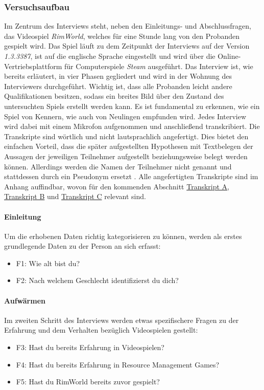 \subsubsection{Versuchsaufbau}
Im Zentrum des Interviews steht, neben den Einleitungs- und Abschlussfragen, das Videospiel \textit{RimWorld}, welches für eine Stunde lang von den Probanden gespielt wird. Das Spiel läuft zu dem Zeitpunkt der Interviews auf der Version \textit{1.3.3387}, ist auf die englische Sprache eingestellt und wird über die Online-Vertriebsplattform für Computerspiele \textit{Steam} ausgeführt.
Das Interview ist, wie bereits erläutert, in vier Phasen gegliedert und wird in der Wohnung des Interviewers durchgeführt. Wichtig ist, dass alle Probanden leicht andere Qualifikationen besitzen, sodass ein breites Bild über den Zustand des untersuchten Spiels erstellt werden kann. Es ist fundamental zu erkennen, wie ein Spiel von Kennern, wie auch von Neulingen empfunden wird. Jedes Interview wird dabei mit einem Mikrofon aufgenommen und anschließend transkribiert. Die Transkripte sind wörtlich und nicht lautsprachlich angefertigt. Dies bietet den einfachen Vorteil, dass die später aufgestellten Hypothesen mit Textbelegen der Aussagen der jeweiligen Teilnehmer aufgestellt beziehungsweise belegt werden können. Allerdings werden die Namen der Teilnehmer nicht genannt und stattdessen durch ein Pseudonym ersetzt \cite*[S.97]{lankoski_bjork}. Alle angefertigten Transkripte sind im Anhang auffindbar, wovon für den kommenden Abschnitt \hyperref[transcript:A]{Transkript A}, \hyperref[transcript:B]{Transkript B} und \hyperref[transcript:C]{Transkript C} relevant sind.
 
\paragraph {Einleitung}
Um die erhobenen Daten richtig kategorisieren zu können, werden als erstes grundlegende Daten zu der Person an sich erfasst:
\begin{itemize}
    \item F1: Wie alt bist du?
    \item F2: Nach welchem Geschlecht identifizierst du dich?
\end{itemize}

\paragraph{Aufwärmen}
Im zweiten Schritt des Interviews werden etwas spezifischere Fragen zu der Erfahrung und dem Verhalten bezüglich Videospielen gestellt:
\begin{itemize}
    \item F3: Hast du bereits Erfahrung in Videospielen?
    \item F4: Hast du bereits Erfahrung in Resource Management Games?
    \item F5: Hast du RimWorld bereits zuvor gespielt?
\end{itemize}

